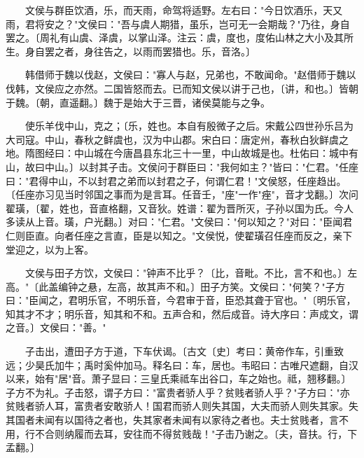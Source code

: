 　　文侯与群臣饮酒，乐，而天雨，命驾将适野。左右曰："今日饮酒乐，天又雨，君将安之？"文侯曰："吾与虞人期猎，虽乐，岂可无一会期哉？"乃往，身自罢之。〔周礼有山虞、泽虞，以掌山泽。注云：虞，度也，度佑山林之大小及其所生。身自罢之者，身往告之，以雨而罢猎也。乐，音洛。〕

　　韩借师于魏以伐赵，文侯曰："寡人与赵，兄弟也，不敢闻命。"赵借师于魏以伐韩，文侯应之亦然。二国皆怒而去。已而知文侯以讲于己也，〔讲，和也。〕皆朝于魏。〔朝，直遥翻。〕魏于是始大于三晋，诸侯莫能与之争。

　　使乐羊伐中山，克之；〔乐，姓也。本自有殷微子之后。宋戴公四世孙乐吕为大司寇。中山，春秋之鲜虞也，汉为中山郡。宋白曰：唐定州，春秋白狄鲜虞之地。隋图经曰：中山城在今唐昌县东北三十一里，中山故城是也。杜佑曰：城中有山，故曰中山。〕以封其子击。文侯问于群臣曰："我何如主？"皆曰："仁君。"任座曰："君得中山，不以封君之弟而以封君之子，何谓仁君！"文侯怒，任座趋出。〔任座亦习见当时邻国之事而为是言耳。任音壬，"座"一作"痤"，音才戈翻。〕次问翟璜，〔翟，姓也，音直格翻，又音狄。姓谱：翟为晋所灭，子孙以国为氏。今人多读从上音。璜，户光翻。〕对曰："仁君。"文侯曰："何以知之？"对曰："臣闻君仁则臣直。向者任座之言直，臣是以知之。"文侯悦，使翟璜召任座而反之，亲下堂迎之，以为上客。

　　文侯与田子方饮，文侯曰："钟声不比乎？〔比，音毗。不比，言不和也。〕左高。"〔此盖编钟之悬，左高，故其声不和。〕田子方笑。文侯曰："何笑？"子方曰："臣闻之，君明乐官，不明乐音，今君审于音，臣恐其聋于官也。"〔明乐官，知其才不才；明乐音，知其和不和。五声合和，然后成音。诗大序曰：声成文，谓之音。〕文侯曰："善。"

　　子击出，遭田子方于道，下车伏谒。〔古文〔史〕考曰：黄帝作车，引重致远；少昊氏加牛；禹时奚仲加马。释名曰：车，居也。韦昭曰：古唯尺遮翻，自汉以来，始有"居"音。萧子显曰：三皇氏乘祗车出谷口，车之始也。祗，翘移翻。〕子方不为礼。子击怒，谓子方曰："富贵者骄人乎？贫贱者骄人乎？"子方曰："亦贫贱者骄人耳，富贵者安敢骄人！国君而骄人则失其国，大夫而骄人则失其家。失其国者未闻有以国待之者也，失其家者未闻有以家待之者也。夫士贫贱者，言不用，行不合则纳履而去耳，安往而不得贫贱哉！"子击乃谢之。〔夫，音扶。行，下孟翻。〕

